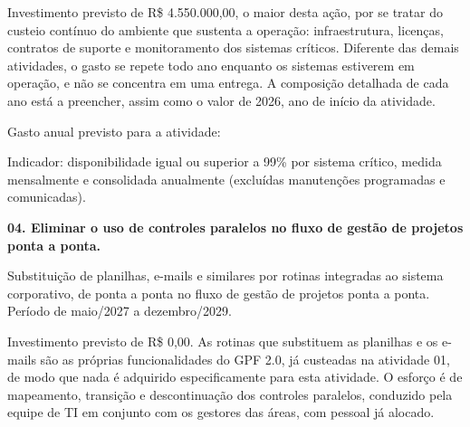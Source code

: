 \documentclass[12pt,a4paper]{article}
\newcommand{\atividade}[1]{%
  \par{\bfseries\color{azulAtividade}#1}\par
}
\begin{document}
Investimento previsto de R\$ 4.550.000,00, o maior desta ação, por se tratar do custeio contínuo do ambiente que sustenta a operação: infraestrutura, licenças, contratos de suporte e monitoramento dos sistemas críticos. Diferente das demais atividades, o gasto se repete todo ano enquanto os sistemas estiverem em operação, e não se concentra em uma entrega. A composição detalhada de cada ano está a preencher, assim como o valor de 2026, ano de início da atividade.

Gasto anual previsto para a atividade:

\begingroup
\footnotesize
{}
\renewcommand{\arraystretch}{1.3}
\setlength{\tabcolsep}{4pt}
\noindent{}
\endgroup

Indicador: disponibilidade igual ou superior a 99\% por sistema crítico, medida mensalmente e consolidada anualmente (excluídas manutenções programadas e comunicadas).

\atividade{04. Eliminar o uso de controles paralelos no fluxo de gestão de projetos ponta a ponta.}

Substituição de planilhas, e-mails e similares por rotinas integradas ao sistema corporativo, de ponta a ponta no fluxo de gestão de projetos ponta a ponta. Período de maio/2027 a dezembro/2029.

Investimento previsto de R\$ 0,00. As rotinas que substituem as planilhas e os e-mails são as próprias funcionalidades do GPF 2.0, já custeadas na atividade 01, de modo que nada é adquirido especificamente para esta atividade. O esforço é de mapeamento, transição e descontinuação dos controles paralelos, conduzido pela equipe de TI em conjunto com os gestores das áreas, com pessoal já alocado.
\end{document}
